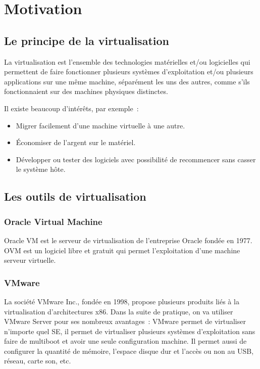 \documentclass[12pt,a4paper]{report}
\begin{document}
\section{Motivation}

\subsection{Le principe de la virtualisation}

La virtualisation est l'ensemble des technologies matérielles et/ou logicielles
qui permettent de faire fonctionner plusieurs systèmes d'exploitation et/ou
plusieurs applications sur une même machine, séparément les uns des autres,
comme s'ils fonctionnaient sur des machines physiques distinctes.

Il existe beaucoup d'intérêts, par exemple~:

\begin{itemize}[leftmargin=*]
  \item Migrer facilement d'une machine virtuelle à une autre.
  \item Économiser de l'argent sur le matériel.
  \item Développer ou tester des logiciels avec possibilité de recommencer
        sans casser le système hôte.
\end{itemize}

\subsection{Les outils de virtualisation}

\subsubsection{Oracle Virtual Machine}

Oracle VM est le serveur de virtualisation de l'entreprise Oracle fondée en 1977.
OVM est un logiciel libre et gratuit qui permet l'exploitation d'une machine
serveur virtuelle.

\subsubsection{VMware}

La société VMware Inc., fondée en 1998, propose plusieurs produits liés à la
virtualisation d'architectures x86. Dans la suite de pratique, on va utiliser
VMware Server pour ses nombreux avantages~: VMware permet de virtualiser
n'importe quel SE, il permet de virtualiser plusieurs systèmes d'exploitation
sans faire de multiboot et avoir une seule configuration machine. Il permet
aussi de configurer la quantité de mémoire, l'espace disque dur et l'accès ou
non au USB, réseau, carte son, etc.
\end{document}

